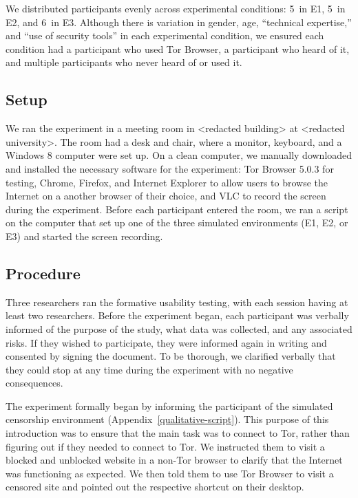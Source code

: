 \documentclass[USenglish,oneside,twocolumn]{article}
\begin{document}
We distributed participants evenly across experimental conditions:  5~in E1, 5~in E2, and 6~in E3. Although there is variation in gender, age, ``technical expertise,'' and ``use of security tools'' in each experimental condition, we ensured each condition had a participant who used Tor Browser, a participant who heard of it, and multiple participants who never heard of or used it. 

\subsection{Setup} 
We ran the experiment in a meeting room in <redacted building> at <redacted university>. The room had a desk and chair, where a monitor, keyboard, and a Windows 8 computer were set up. On a clean computer, we manually downloaded and installed the necessary software for the experiment: Tor Browser 5.0.3 for testing, Chrome, Firefox, and Internet Explorer to allow users to browse the Internet on a another browser of their choice, and VLC to record the screen during the experiment. Before each participant entered the room, we ran a script on the computer that
set up one of the three simulated environments (E1, E2, or E3) and started the screen recording.  

\subsection{Procedure}
Three researchers ran the formative usability testing, with each session having at least two researchers.  
Before the experiment began, each participant was verbally informed of the purpose of the 
study, what data was collected, and any associated risks. If they wished to participate,
they were informed again in writing and consented by signing the document. To be thorough, 
we clarified verbally that they could stop at any time during the experiment with no negative consequences. 

The experiment formally began by informing the participant of the simulated censorship environment (Appendix~\ref{qualitative-script}). This purpose of this introduction was to ensure that the main task
was to connect to Tor, rather than figuring out if they needed to connect to Tor. 
We instructed them to visit a blocked and unblocked website
in a non-Tor browser to clarify that the Internet was functioning as expected. 
We then told them to use Tor Browser to visit a censored site and pointed out 
the respective shortcut on their desktop.
\end{document}
